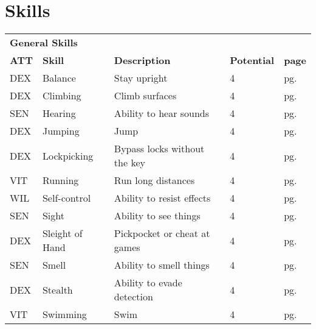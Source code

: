 \chapter{Skills}\label{skills}





\begin{multicols*}{2}
    \begin{table*}[ht]
        \unclassedrowcolors
        \begin{tabularx}{\textwidth}{l l X l l}
            \multicolumn{5}{l}{\bfseries{General Skills}} \\
            \bfseries{ATT} & \bfseries{Skill} & \bfseries{Description} & \bfseries{Potential} & \bfseries{page} \\
            DEX & Balance & Stay upright & 4 & pg. \pageref{skill:balance} \\
            DEX & Climbing & Climb surfaces & 4 & pg. \pageref{skill:climbing} \\
            SEN & Hearing & Ability to hear sounds & 4 & pg. \pageref{skill:hearing} \\
            DEX & Jumping & Jump & 4 & pg. \pageref{skill:jumping} \\
            DEX & Lockpicking & Bypass locks without the key & 4 & pg. \pageref{skill:lockpicking} \\
            VIT & Running & Run long distances & 4 & pg. \pageref{skill:running} \\
            WIL & Self-control & Ability to resist effects & 4 & pg. \pageref{skill:self-control} \\
            SEN & Sight & Ability to see things & 4 & pg. \pageref{skill:sight} \\
            DEX & Sleight of Hand & Pickpocket or cheat at games & 4 & pg. \pageref{skill:sleight-of-hand} \\
            SEN & Smell & Ability to smell things & 4 & pg. \pageref{skill:smell} \\
            DEX & Stealth & Ability to evade detection & 4 & pg. \pageref{skill:stealth} \\
            VIT & Swimming & Swim & 4 & pg. \pageref{skill:swimming} \\

\end{tabularx}
\end{table*}
\end{multicols*}
